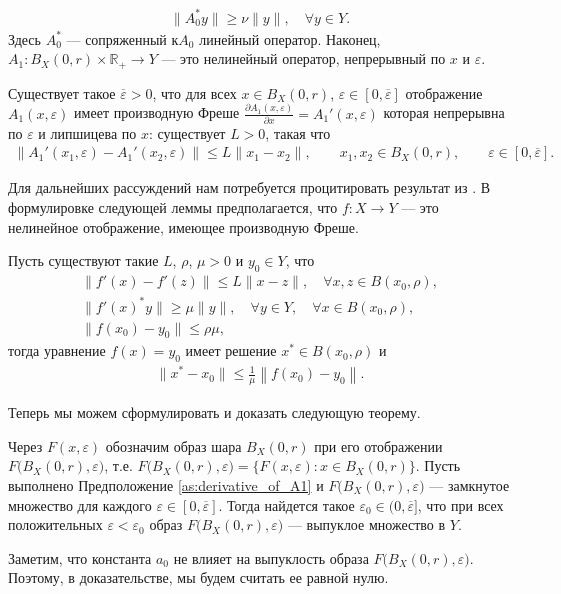 \documentclass[../main.tex]{subfiles}
\begin{document}
\begin{gather}\label{regular}
	\| A_0^*y\| \geqslant \nu \|y\|, \quad \forall y \in Y.
\end{gather}
Здесь $A_0^* $ --- сопряженный к$A_0$ линейный оператор.
Наконец,  $A_1: B_X(0, r) \times \mathbb{R}_+ \to Y $ --- это нелинейный оператор, непрерывный по $x$ и $\varepsilon$.
\begin{assumption}\label{as:derivative_of_A1}
	Существует такое $\overline{\varepsilon} > 0$, что для всех $x \in B_X(0,r)$, $\varepsilon \in [0, \overline{\varepsilon}]$ отображение $A_1(x, \varepsilon)$  имеет производную Фреше $\frac{\partial A_1(x, \varepsilon)}{\partial x} = A_1'(x, \varepsilon)$  которая непрерывна по $\varepsilon$ и липшицева по $x$: существует $L>0$, такая что
	\begin{gather*}
		\|A_1'(x_1,\varepsilon) - A_1'(x_2,\varepsilon) \| \leqslant L\|x_1-x_2\|, \qquad x_1, x_2 \in B_X(0,r), \qquad \varepsilon \in [0, \overline{\varepsilon}].
	\end{gather*}
\end{assumption}

Для дальнейших рассуждений нам потребуется процитировать результат из \cite{Polyak2001, Polyak1964}.  В формулировке следующей леммы предполагается, что $f:X \to Y$ --- это нелинейное отображение, имеющее производную Фреше.
\begin{lemma}\label{lem:Polyak_lemma}
	Пусть существуют такие $L$, $\rho$, $\mu > 0$ и $y_0 \in Y$, что 
	\begin{gather*}
		\| f'(x) - f'(z) \| \leqslant L \| x - z\|, \quad \forall x,z \in B(x_0,\rho), \\
		\| f'(x)^*y \| \geqslant \mu \|y \|, \quad \forall y \in Y, \quad \forall x \in B(x_0, \rho), \\
		\| f(x_0) - y_0 \| \leqslant \rho \mu,
	\end{gather*}
	тогда уравнение $f(x) = y_0$ имеет решение $x^* \in B(x_0,\rho)$ и 
	\begin{gather*}
		\|x^* - x_0\| \leqslant \frac{1}{\mu} \left\| f(x_0) - y_0 \right\|.
	\end{gather*}
\end{lemma}
Теперь мы можем сформулировать и доказать следующую теорему.
\begin{theorem}\label{th:ImageConvexity}
	Через $F(x,\varepsilon)$ обозначим образ шара $B_X(0, r)$ при его отображении $F\big(B_X(0,r),\varepsilon\big)$, т.е. $F\big(B_X(0,r),\varepsilon\big) = \big\{F(x,\varepsilon): x\in B_X(0, r)\big\}$.
	Пусть выполнено Предположение \ref{as:derivative_of_A1} и $F\big(B_X(0,r),\varepsilon\big)$ --- замкнутое множество для каждого  $\varepsilon \in [0, \overline{\varepsilon}]$. Тогда найдется такое $ \varepsilon_0 \in (0, \overline{\varepsilon}]$, что при всех положительных $\varepsilon < \varepsilon_0$ образ $F\big(B_X(0,r),\varepsilon\big)$ --- выпуклое множество в $Y$. 
\end{theorem}
\doc
Заметим, что константа $a_0$ не влияет на выпуклость образа $F\big(B_X(0,r),\varepsilon\big)$. 
Поэтому, в доказательстве, мы будем считать ее равной нулю.
\end{document}
